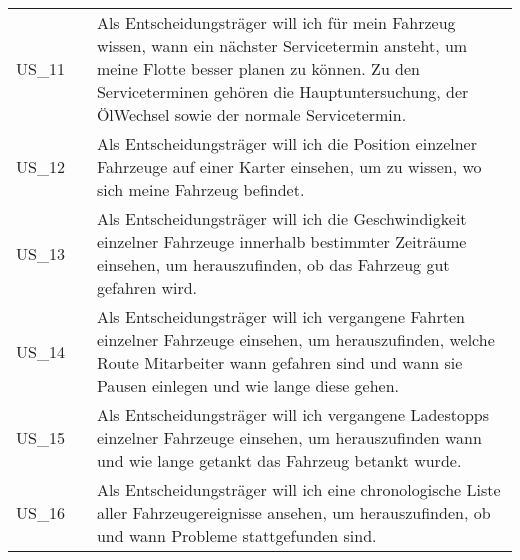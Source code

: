 \begin{footnotesize}
\begin{longtable}[i i L]{ p{} p{} p{} }
      US\_11 & & Als Entscheidungsträger will ich für mein Fahrzeug wissen, wann ein nächster Servicetermin ansteht, um meine Flotte besser planen zu können. Zu den Serviceterminen gehören die Hauptuntersuchung, der ÖlWechsel sowie der normale Servicetermin. \\
      US\_12 & & Als Entscheidungsträger will ich die Position einzelner Fahrzeuge auf einer Karter einsehen, um zu wissen, wo sich meine Fahrzeug befindet. \\
      US\_13 & & Als Entscheidungsträger will ich die Geschwindigkeit einzelner Fahrzeuge innerhalb bestimmter Zeiträume einsehen, um herauszufinden, ob das Fahrzeug gut gefahren wird. \\
      US\_14 & & Als Entscheidungsträger will ich vergangene Fahrten einzelner Fahrzeuge einsehen, um herauszufinden, welche Route Mitarbeiter wann gefahren sind und wann sie Pausen einlegen und wie lange diese gehen. \\
      US\_15 & & Als Entscheidungsträger will ich vergangene Ladestopps einzelner Fahrzeuge einsehen, um herauszufinden wann und wie lange getankt das Fahrzeug betankt wurde. \\
      US\_16 & & Als Entscheidungsträger will ich eine chronologische Liste aller Fahrzeugereignisse ansehen, um herauszufinden, ob und wann Probleme stattgefunden sind. \\
     
      \bottomrule
    \end{longtable}
  \end{footnotesize}
  \rmfamily


